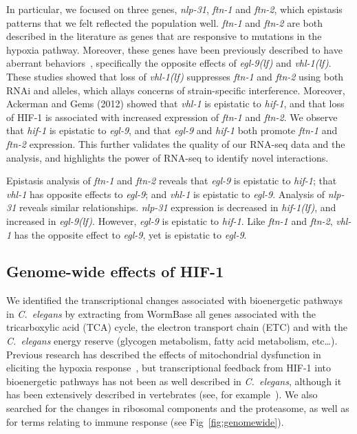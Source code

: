 \documentclass[9pt,twocolumn,twoside]{pnas-new}
\newcommand{\cel}{\emph{C.~elegans}}
\newcommand{\gene}[1]{\emph{#1}}
\newcommand{\nlp}{\emph{nlp-31}}
\newcommand{\ftna}{\emph{ftn-1}}
\newcommand{\ftnb}{\emph{ftn-2}}
\newcommand{\egl}{\emph{egl-9(lf)}}
\newcommand{\vhl}{\emph{vhl-1(lf)}}
\newcommand{\hif}{\emph{hif-1(lf)}}
\newcommand{\hifp}{HIF-1}
\begin{document}
In particular, we focused on three genes, \nlp{}, \ftna{} and \ftnb{}, which
epistasis patterns that we felt reflected the population well. \ftna{} and \ftnb{}
are both described in the literature as genes that are responsive to mutations in
the hypoxia pathway. Moreover, these genes have been previously described to have
aberrant behaviors~\cite{Ackerman2012,Romney2011}, specifically the
opposite effects of \egl{} and \vhl{}. These studies showed that loss of \vhl{}
suppresses \ftna{} and \ftnb{} using both RNAi and alleles, which allays concerns
of strain-specific interference. Moreover, Ackerman and Gems (2012) showed that
\gene{vhl-1} is epistatic to \gene{hif-1}, and that loss of
\hifp{} is associated with increased expression of \ftna{} and \ftnb{}. We observe
that \gene{hif-1} is epistatic to \gene{egl-9}, and that \gene{egl-9} and
\gene{hif-1} both promote \ftna{} and \ftnb{} expression.
This further validates the quality of our RNA-seq data and the analysis, and
highlights the power of RNA-seq to identify novel interactions.

Epistasis analysis of \ftna{} and \ftnb{} reveals that \gene{egl-9} is
epistatic to \gene{hif-1}; that \gene{vhl-1} has opposite effects to \gene{egl-9};
and \gene{vhl-1} is epistatic to \gene{egl-9}. Analysis of \nlp{}
reveals similar relationships. \nlp{} expression is decreased in \hif{},
and increased in \egl{}. However, \gene{egl-9} is epistatic to \gene{hif-1}.
Like \ftna{} and \ftnb{}, \gene{vhl-1} has the opposite effect to \gene{egl-9},
yet is epistatic to \gene{egl-9}.

\subsection{Genome-wide effects of \hifp{}}
\label{sub:metabolism}

We identified the transcriptional changes
associated with bioenergetic pathways in \cel{} by extracting from
WormBase all genes associated with the tricarboxylic acid (TCA) cycle, the
electron transport chain (ETC) and with the \cel{} energy reserve (glycogen
metabolism, fatty acid metabolism, etc\ldots). Previous research has described
the effects of mitochondrial dysfunction in eliciting the hypoxia
response~\cite{Lee2010}, but transcriptional feedback from \hifp{} into
bioenergetic pathways has not been as well described in \cel{}, although it has
been extensively described in vertebrates (see, for example~\cite{Semenza1994,
Semenza2012}).
We also searched for the changes in ribosomal components and the proteasome, as
well as for terms relating to immune response (see Fig~\ref{fig:genomewide}).
\end{document}

